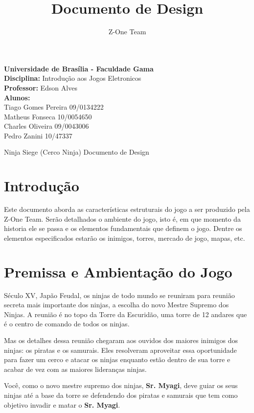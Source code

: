 \documentclass[10pt,a4paper]{article}
\author{Z-One Team}
\title{Documento de Design}
\begin{document}
\begin{flushleft}
{\bf Universidade de Brasília - Faculdade Gama}\\
{\bf Disciplina:} Introdução aos Jogos Eletronicos\\
{\bf Professor:} Edson Alves\\
{\bf Alunos:}\\
Tiago Gomes Pereira	09/0134222\\
Matheus Fonseca	10/0054650\\
Charles Oliveira	09/0043006\\  
Pedro Zanini	10/47337\\
\end{flushleft}



\begin{center}
Ninja Siege (Cerco Ninja)
Documento de Design
\end{center}

\section{Introdução}
	Este documento aborda as características estruturais do jogo a ser produzido pela Z-One Team. Serão detalhados o ambiente do jogo, isto é, em que momento da historia ele se passa e os elementos fundamentais que definem o jogo. Dentre os elementos especificados estarão os inimigos, torres, mercado de jogo, mapas, etc.

\section{Premissa e Ambientação do Jogo}
	Século XV, Japão Feudal, os ninjas de todo mundo se reuniram para reunião secreta mais importante dos ninjas, a escolha do novo Mestre Supremo dos Ninjas. A reunião é no topo da Torre da Escuridão, uma torre de 12 andares que é o centro de comando de todos os ninjas.

	Mas os detalhes dessa reunião chegaram aos ouvidos dos maiores inimigos dos ninjas: os piratas e os samurais. Eles resolveram aproveitar essa oportunidade para fazer um cerco e atacar os ninjas enquanto estão dentro de sua torre e acabar de vez com as maiores lideranças ninjas.

    Você, como o novo mestre supremo dos ninjas, \textbf{Sr. Myagi}, deve guiar os seus ninjas até a base da torre se defendendo dos piratas e samurais que tem como objetivo invadir e matar o \textbf{Sr. Myagi}.
\end{document}
